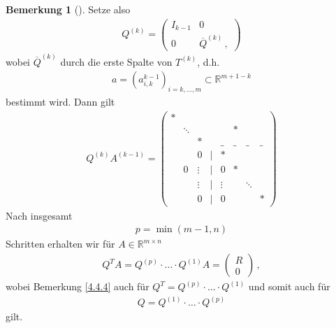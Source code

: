 \documentclass[ngerman,fontsize=11pt, paper=a4, parskip=half, titlepage=true, toc=bib]{scrbook}
\theoremstyle{definition}
\newtheorem{Bem}[Def]{Bemerkung}	%
\theoremstyle{plain}
\newcommand{\R}{\mathds{R}}
\newenvironment{Beme}[1][]{ %
	\begin{Bem}[#1]
	}
	{
	\end{Bem}
	\addtocounter{subsection}{1}
}
\begin{document}
\begin{Beme}
  	Setze also
  	\begin{gather}
  	Q^{(k)} = \begin{pmatrix}
  	I_{k-1} & 0 \\
  	0 & \overline{Q}^{(k)} \, ,
  	\label{IV.4.13}
  	\end{pmatrix}
  	\end{gather}
  	wobei $\overline{Q}^{(k)} $ durch die erste Spalte von $T^{(k)}$, d.h.
  	\begin{gather}
  	a= (a_{i,k}^{k-1})_{i=k,\dotsc, m} \subset \R^{m+1-k}
  	\label{IV.4.14}
  	\end{gather}
  	bestimmt wird. Dann gilt
  	\begin{gather*}
  	Q^{(k)}A^{(k-1)} =
  	\begin{pmatrix}
  	*  &&&&&\\
  	&\ddots &&&& * \\
  	&&*&&\_&\_&\_&\_ \\
  	&&0&|&* \\
  	&0&\vdots&|&0&* \\
  	&&\vdots&  |&\vdots &&\ddots\\
  	&&0&  |&0&&&*
  	\end{pmatrix}
  	\end{gather*}
  	Nach insgesamt 
  	\begin{gather}
  	p=\min (m-1, n)
  	\label{IV.4.15}
  	\end{gather}
  	Schritten erhalten wir für $A\in \R^{m\times n}$
  	\begin{gather}
  	Q^TA = Q^{(p)}\cdot \dotsc \cdot Q^{(1)}A 
  	= \begin{pmatrix} R\\0\end{pmatrix}\, ,
  	\end{gather}
  	wobei Bemerkung \ref{4.4.4} auch für 
  	$Q^T= Q^{(p)}\cdot \dotsc \cdot Q^{(1)} $ und somit auch für
  	\begin{gather}
  	Q = Q^{(1)}\cdot \dotsc \cdot Q^{(p)}
  	\label{IV.4.16}
  	\end{gather}
  	gilt.
  \end{Beme}
  
  
  
\end{document}
